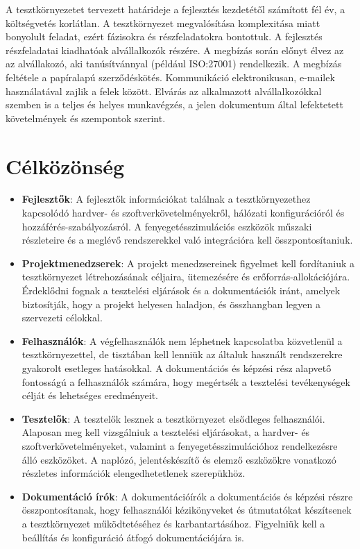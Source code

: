\documentclass{scrreprt}
\begin{document}
A tesztkörnyezetet tervezett határideje a fejlesztés kezdetétől számított fél év, a költségvetés korlátlan. A tesztkörnyezet megvalósítása komplexitása miatt bonyolult feladat, ezért fázisokra és részfeladatokra bontottuk.
\newline
A fejlesztés részfeladatai kiadhatóak alvállalkozók részére. A megbízás során előnyt élvez az az alvállakozó, aki tanúsítvánnyal (például ISO:27001) rendelkezik. A megbízás feltétele a papíralapú szerződéskötés. Kommunikáció elektronikusan, e-mailek használatával zajlik a felek között. Elvárás az alkalmazott alvállalkozókkal szemben is a teljes és helyes munkavégzés, a jelen dokumentum által lefektetett követelmények és szempontok szerint.

\section{Célközönség}

\begin{itemize}
      \item \textbf{Fejlesztők}:
            A fejlesztők információkat találnak a tesztkörnyezethez kapcsolódó hardver- és szoftverkövetelményekről, hálózati konfigurációról és hozzáférés-szabályozásról. A fenyegetésszimulációs eszközök műszaki részleteire és a meglévő rendszerekkel való integrációra kell összpontosítaniuk.
      \item \textbf{Projektmenedzserek}:
            A projekt menedzsereinek figyelmet kell fordítaniuk a tesztkörnyezet létrehozásának céljaira, ütemezésére és erőforrás-allokációjára. Érdeklődni fognak a tesztelési eljárások és a dokumentációk iránt, amelyek biztosítják, hogy a projekt helyesen haladjon, és összhangban legyen a szervezeti célokkal.
      \item \textbf{Felhasználók}:
            A végfelhasználók nem léphetnek kapcsolatba közvetlenül a tesztkörnyezettel, de tisztában kell lenniük az általuk használt rendszerekre gyakorolt esetleges hatásokkal. A dokumentációs és képzési rész alapvető fontosságú a felhasználók számára, hogy megértsék a tesztelési tevékenységek célját és lehetséges eredményeit.
      \item \textbf{Tesztelők}:
            A tesztelők lesznek a tesztkörnyezet elsődleges felhasználói. Alaposan meg kell vizsgálniuk a tesztelési eljárásokat, a hardver- és szoftverkövetelményeket, valamint a fenyegetésszimulációhoz rendelkezésre álló eszközöket. A naplózó, jelentéskészítő és elemző eszközökre vonatkozó részletes információk elengedhetetlenek szerepükhöz.
      \item \textbf{Dokumentáció írók}:
            A dokumentációírók a dokumentációs és képzési részre összpontosítanak, hogy felhasználói kézikönyveket és útmutatókat készítsenek a tesztkörnyezet működtetéséhez és karbantartásához. Figyelniük kell a beállítás és konfiguráció átfogó dokumentációjára is.
\end{itemize}
\end{document}
